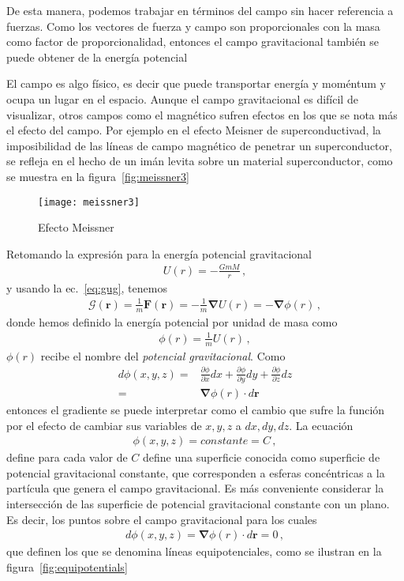 De esta manera, podemos trabajar en términos del campo sin hacer referencia a fuerzas. Como los vectores de fuerza y campo son proporcionales con la masa como factor de proporcionalidad, entonces el campo gravitacional también se puede obtener de la energía potencial

El campo es algo físico, es decir que puede transportar energía y moméntum y ocupa un lugar en el espacio. Aunque el campo gravitacional es difícil de visualizar, otros campos como el magnético sufren efectos en los que se nota más el efecto del campo. Por ejemplo en el efecto Meisner de superconductivad, la imposibilidad de las líneas de campo magnético de penetrar un superconductor, se refleja en el hecho de un imán levita sobre un material superconductor, como se muestra en la figura~\ref{fig:meissner3}
\begin{frame}
  \begin{figure}
  \centering
  \texttt{[image: meissner3]}
  \caption{Efecto Meissner}
  \label{fig:meisner3}
\end{figure}
\end{frame}
Retomando la expresión para la energía potencial gravitacional
\begin{align*}
  U(r)=-\frac{GmM}{r}\,,
\end{align*}
y usando la ec.~\eqref{eq:gug}, tenemos
\begin{align}
  \boldsymbol{\mathcal{G}}(\mathbf{r})=\frac{1}{m}\mathbf{F}(\mathbf{r})=-\frac{1}{m}\boldsymbol{\nabla}U(r)=-\boldsymbol{\nabla}\phi(r)\,,
\end{align}
donde hemos definido la energía potencial por unidad de masa como
\begin{align}
  \phi(r)=\frac{1}{m}U(r)\,,
\end{align}
$\phi(r)$ recibe el nombre del \emph{potencial gravitacional}. Como
\begin{align*}
  d\phi(x,y,z)=&\frac{\partial \phi}{\partial x}dx+\frac{\partial \phi}{\partial y}dy+\frac{\partial \phi}{\partial z}dz\nonumber\\
  =&\boldsymbol{\nabla}\phi(r)\cdot d\mathbf{r}
\end{align*}
entonces el gradiente se puede interpretar como el cambio que sufre la función por el efecto de cambiar sus variables de $x,y,z$ a $dx,dy,dz$. La ecuación
\begin{align*}
  \phi(x,y,z)=constante=C\,,
\end{align*}
define para cada valor de $C$ define una superficie conocida como superficie de potencial gravitacional constante, que corresponden a esferas concéntricas a la partícula que genera el campo gravitacional. Es más conveniente considerar la intersección de las superficie de potencial gravitacional constante con un plano. Es decir, los puntos sobre el campo gravitacional para los cuales
\begin{align*}
  d\phi(x,y,z)=\boldsymbol{\nabla}\phi(r)\cdot d\mathbf{r}=0\,,
\end{align*}
que definen los que se denomina líneas equipotenciales, como se ilustran en la figura~\ref{fig:equipotentials}

